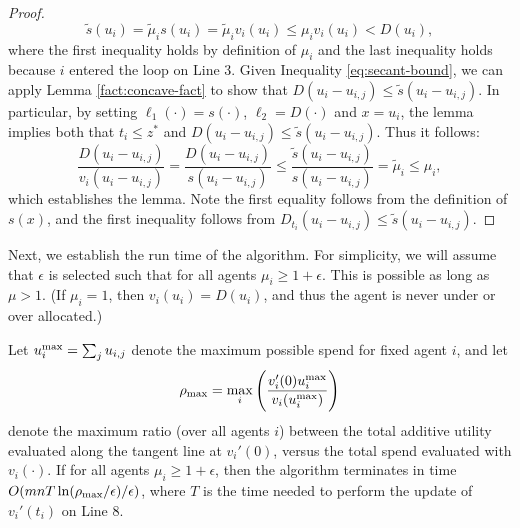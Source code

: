 \begin{proof}
\begin{equation}
\label{eq:secant-bound}
\tilde s(u_i) = \tilde\mu_i s(u_i) = \tilde\mu_iv_i(u_i)  \leq \mu_i v_i(u_i) < D(u_i),
\end{equation} 
where the first inequality holds by definition of $\mu_i$ and the last inequality holds because $i$ entered the loop on Line 3.  Given Inequality \eqref{eq:secant-bound}, we can  apply  Lemma \ref{fact:concave-fact} to show that $D(u_i - u_{i,j}) \leq  \tilde s(u_i - u_{i,j})$. In particular, by setting $\ell_1(\cdot) = s(\cdot)$, $\ell_2 = D(\cdot)$ and $x = u_i$, the lemma implies both that $t_i \leq z^*$ and $D(u_i - u_{i,j}) \leq   \tilde s(u_i - u_{i,j})$. Thus it follows:
\begin{equation}
\label{eq:ratio-est}
\frac{D(u_i-u_{i,j})}{v_i(u_i-u_{i,j})} =\frac{D(u_i-u_{i,j})}{s(u_i-u_{i,j})} \leq \frac{\tilde s(u_i-u_{i,j})}{s(u_i-u_{i,j})} = \tilde\mu_i \leq \mu_i,
\end{equation} 
 which establishes the lemma.  Note the first equality follows from the definition of $s(x)$, and the first inequality follows from $D_{t_i}(u_i - u_{i,j}) \leq   \tilde s(u_i - u_{i,j})$.
\end{proof}










Next,  we establish the run time of the algorithm. For simplicity, we will assume that $\epsilon$ is selected such that for all agents $\mu_i \geq 1+\epsilon$. This is possible as long as $\mu > 1$. (If $\mu_i = 1$, then $v_i(u_i) = D(u_i)$, and thus the agent is never under or over allocated.)


\begin{lemma}
\label{lem:alg-pd-term}
Let $u_i^{\max} = \sum_{j} u_{i,j}$ denote the maximum possible spend for fixed agent $i$, and let 
\begin{equation*}
\rho_{\max} = \max_i \left(\frac{v_i'(0)u_i^{\max}}{v_i(u_i^{\max})}\right)
\end{equation*} 
denote the maximum ratio (over all agents $i$) between the total additive utility evaluated along the tangent line at $v_i'(0)$, versus the total spend evaluated with $v_i(\cdot)$. If for all agents $\mu_i \geq 1+\epsilon$, then the algorithm terminates in time $O(mnT\ln(\rho_{\max}/\epsilon)/\epsilon)$, 
where $T$ is the time needed to perform the update of $v_i'(t_i)$ on Line 8.
\end{lemma} 


